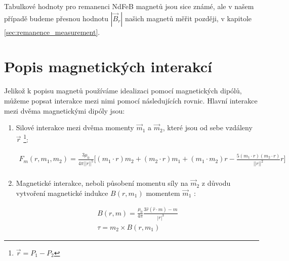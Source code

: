 \documentclass[12pt, a4paper,
 twoside,        %
 openright
]{report}
\begin{document}
Tabulkové hodnoty pro remanenci NdFeB magnetů jsou sice známé, ale v našem případě budeme přesnou hodnotu $|\vec{B}_r|$ našich magnetů měřit později, v kapitole \ref{sec:remanence_measurement}.

\section{Popis magnetických interakcí}

Jelikož k popisu magnetů používáme idealizaci pomocí magnetických dipólů, můžeme popsat interakce mezi nimi pomocí následujících rovnic.
Hlavní interakce mezi dvěma magnetickými dipóly jsou:
\begin{enumerate}[topsep=0pt, partopsep=0pt]
    \setlength{\itemsep}{0pt}%
    \setlength{\parskip}{0pt}%

    \item Silové interakce \cite{magnetic_force} mezi dvěma momenty $\vec{m}_1$ a $\vec{m}_2$, které jsou od sebe vzdáleny $\vec{r}$ \footnote{$\vec{r} = P_1 - P_2$}:

          \begin{equation}
              \label{eq:F_m}
              \begin{split}
                  F_m (r,m_1,m_2) = \frac{3\mu_0}{4\pi ||r||^5}
                  \bigg[
                      (m_1\cdot r) m_2 +
                      (m_2\cdot r) m_1 +
                      (m_1\cdot m_2) r -
                      \frac{5(m_1\cdot r)(m_2\cdot r)}{||r||^2} r
                  \bigg] \\
              \end{split}
          \end{equation}

    \item Magnetické interakce, neboli působení momentu síly \cite{magnetic_torque} na $\vec{m}_2$ z důvodu vytvoření magnetické indukce $B(r, m_1)$ momentem $\vec{m}_1$ \cite{magnetic_force}:

          \begin{equation}
              \label{eq:B}
              \begin{split}
                  B (r, m) = \frac{\mu_0}{4\pi}\frac{3 \hat{r}(\hat{r}\cdot m) - m}{|r|^3} \\
                  \tau = m_2 \times B(r, m_1)
              \end{split}
          \end{equation}
\end{enumerate}
\end{document}
